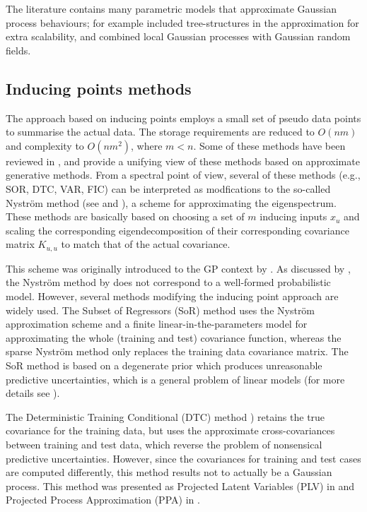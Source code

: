\documentclass[]{interact}
\theoremstyle{plain}%
\theoremstyle{definition}
\theoremstyle{remark}
\begin{document}
The literature contains many parametric models that approximate Gaussian process behaviours; for example \cite{bui2014tree} included  tree-structures in the approximation for extra scalability, and \cite{moore2015gaussian} combined local Gaussian
processes with Gaussian random fields.

\subsection{Inducing points methods}

The approach based on inducing points employs a small set of pseudo data points to summarise the actual data. The storage requirements are reduced to $O(nm)$ and complexity to $O(nm^2)$, where $m < n$. Some of these methods have been reviewed in \cite{rasmussen2006gaussian}, and \cite{quinonero2005unifying} provide a unifying view of these methods based on approximate generative methods. From a spectral point of view, several of these methods (e.g., SOR, DTC, VAR, FIC) can be interpreted as modfications to the so-called Nystr{\"o}m method (see \cite{arthur1979baker} and \cite{williams2001using}), a scheme for approximating the eigenspectrum. These methods are basically based on choosing a set of $m$ inducing inputs $x_u$ and scaling the corresponding eigendecomposition of their corresponding covariance matrix $K_{u,u}$ to match that of the actual covariance. 

This scheme was originally introduced to the GP context by \cite{williams2001using}. As discussed by \cite{quinonero2005unifying}, the Nystr\"om method by \cite{williams2001using} does not correspond to a well-formed probabilistic model. However, several methods modifying the inducing point approach are widely used. The Subset of Regressors (SoR) \citep{smola2001sparse} method uses the Nystr\"om approximation scheme and a finite linear-in-the-parameters model for approximating the whole (training and test) covariance function, whereas the sparse Nystr\"om method \citep{williams2001using} only replaces the training data covariance matrix. The SoR method is based on a degenerate prior which produces unreasonable predictive uncertainties, which is a general problem of linear models (for more details see \cite{rasmussen2006gaussian}). 

The Deterministic Training Conditional (DTC) method \citep{ro2001sparse,seeger2003fast}) retains the true covariance for the training data, but uses the approximate cross-covariances between training and test data, which reverse the problem of nonsensical predictive uncertainties. However, since the covariances for training and test cases are computed differently, this method results not to actually be a Gaussian process. This method was presented as Projected Latent Variables (PLV) in \cite{seeger2003fast} and Projected Process Approximation (PPA) in \cite{rasmussen2006gaussian}. 
\end{document}
